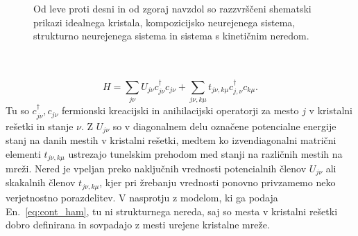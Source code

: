 \documentclass[10pt,a4paper]{article}
\begin{document}
\begin{minipage}[t]{0.43\textwidth}
\begin{figure}[H]
\caption{Od leve proti desni in od zgoraj navzdol so razzvrščeni shematski prikazi idealnega kristala, kompozicijsko neurejenega sistema, strukturno neurejenega sistema in sistema s kinetičnim neredom.  }
\label{fig:disorder_scheme} 
\end{figure}
\end{minipage}\\\\
\begin{equation}\label{eq:disc_ham}
H=\sum\limits_{j\nu}U_{j\nu}c^\dagger_{j\nu}c_{j\nu} + \sum\limits_{j\nu, k\mu} t_{j\nu, k\mu} c^\dagger_{j,\nu}c_{k\mu}.
\end{equation}
Tu so $c^\dagger_{j\nu}, c_{j\nu}$ fermionski kreacijski in anihilacijski operatorji za mesto $j$ v kristalni rešetki in stanje $\nu$. Z $U_{j\nu}$ so v diagonalnem delu označene potencialne energije stanj na danih mestih v kristalni rešetki, medtem ko izvendiagonalni matrični elementi $t_{j\nu, k\mu}$ ustrezajo tunelskim prehodom med stanji na različnih mestih na mreži. Nered je vpeljan preko naključnih vrednosti potencialnih členov $U_{j\nu}$ ali skakalnih členov $t_{j\nu, k\mu}$, kjer pri žrebanju vrednosti ponovno privzamemo neko verjetnostno porazdelitev. V nasprotju z modelom, ki ga podaja En.~\eqref{eq:cont_ham}, tu ni strukturnega nereda, saj so mesta v kristalni rešetki dobro definirana in sovpadajo z mesti urejene kristalne mreže.  \\\\
\end{document}
